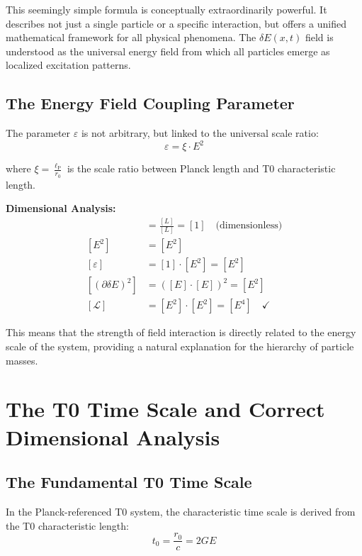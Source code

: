 \documentclass[12pt,a4paper]{report}
\newcommand{\lP}{\ell_{\text{P}}}         %
\newcommand{\rzero}{r_0}                  %
\newcommand{\tzero}{t_0}                  %
\begin{document}
	This seemingly simple formula is conceptually extraordinarily powerful. It describes not just a single particle or a specific interaction, but offers a unified mathematical framework for all physical phenomena. The $\delta E(x,t)$ field is understood as the universal energy field from which all particles emerge as localized excitation patterns.
	
	\subsection{The Energy Field Coupling Parameter}
	
	The parameter $\varepsilon$ is not arbitrary, but linked to the universal scale ratio:
	\begin{equation}
		\varepsilon = \xi \cdot E^2
		\label{eq:energy_coupling}
	\end{equation}
	
	where $\xi = \frac{\lP}{\rzero}$ is the scale ratio between Planck length and T0 characteristic length.
	
	\textbf{Dimensional Analysis:}
	\begin{align}
		[\xi] &= \frac{[L]}{[L]} = [1] \quad \text{(dimensionless)} \\
		[E^2] &= [E^2] \\
		[\varepsilon] &= [1] \cdot [E^2] = [E^2] \\
		[(\partial\delta E)^2] &= ([E] \cdot [E])^2 = [E^2] \\
		[\mathcal{L}] &= [E^2] \cdot [E^2] = [E^4] \quad \checkmark
	\end{align}
	
	This means that the strength of field interaction is directly related to the energy scale of the system, providing a natural explanation for the hierarchy of particle masses.
	
	\section{The T0 Time Scale and Correct Dimensional Analysis}
	
	\subsection{The Fundamental T0 Time Scale}
	
	In the Planck-referenced T0 system, the characteristic time scale is derived from the T0 characteristic length:
	\begin{equation}
		\boxed{\tzero = \frac{\rzero}{c} = 2GE}
		\label{eq:t0_time}
	\end{equation}
	
\end{document}
